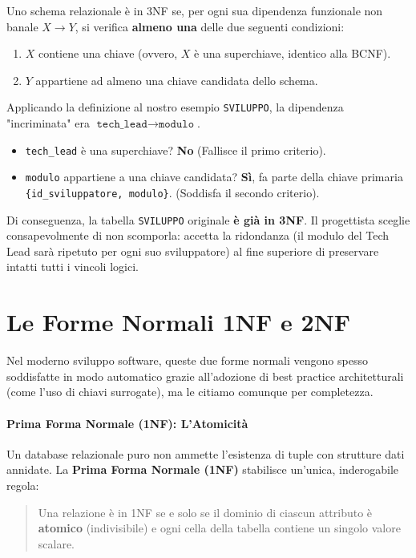 Uno schema relazionale è in 3NF se, per ogni sua dipendenza funzionale non banale $X \rightarrow Y$, si verifica \textbf{almeno una} delle due seguenti condizioni:
\begin{enumerate}
    \item $X$ contiene una chiave (ovvero, $X$ è una superchiave, identico alla BCNF).
    \item $Y$ appartiene ad almeno una chiave candidata dello schema.
\end{enumerate}

\begin{observation}
Applicando la definizione al nostro esempio \texttt{SVILUPPO}, la dipendenza "incriminata" era $\texttt{tech\_lead} \rightarrow \texttt{modulo}$.
\begin{itemize}
    \item \texttt{tech\_lead} è una superchiave? \textbf{No} (Fallisce il primo criterio).
    \item \texttt{modulo} appartiene a una chiave candidata? \textbf{Sì}, fa parte della chiave primaria \texttt{\{id\_sviluppatore, modulo\}}. (Soddisfa il secondo criterio).
\end{itemize}
Di conseguenza, la tabella \texttt{SVILUPPO} originale \textbf{è già in 3NF}. Il progettista sceglie consapevolmente di non scomporla: accetta la ridondanza (il modulo del Tech Lead sarà ripetuto per ogni suo sviluppatore) al fine superiore di preservare intatti tutti i vincoli logici.
\end{observation}

\section{Le Forme Normali 1NF e 2NF}

 Nel moderno sviluppo software, queste due forme normali vengono spesso soddisfatte in modo automatico grazie all'adozione di best practice architetturali (come l'uso di chiavi surrogate), ma le citiamo comunque per completezza.

\paragraph{Prima Forma Normale (1NF): L'Atomicità}
Un database relazionale puro non ammette l'esistenza di tuple con strutture dati annidate. La \textbf{Prima Forma Normale (1NF)} stabilisce un'unica, inderogabile regola:
\begin{quote}
Una relazione è in 1NF se e solo se il dominio di ciascun attributo è \textbf{atomico} (indivisibile) e ogni cella della tabella contiene un singolo valore scalare.
\end{quote}


